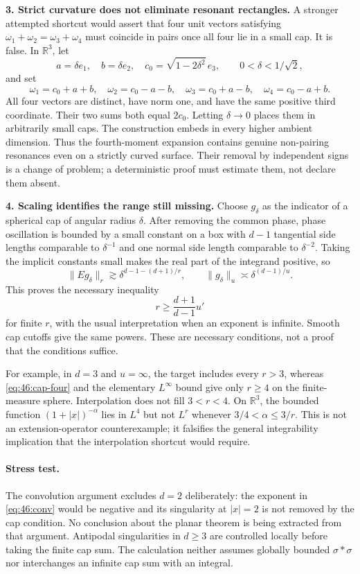 \documentclass[11pt,a4paper]{article}
\newcommand{\R}{\mathbb{R}}
\numberwithin{equation}{section}
\begin{document}
\textbf{3. Strict curvature does not eliminate resonant rectangles.}
A stronger attempted shortcut would assert that four unit vectors satisfying
$\omega_1+\omega_2=\omega_3+\omega_4$ must coincide in pairs once all four
lie in a small cap. It is false. In $\R^3$, let
\[
 a=\delta e_1,\quad b=\delta e_2,\quad
 c_0=\sqrt{1-2\delta^2}\,e_3,\qquad 0<\delta<1/\sqrt2,
\]
and set
\[
 \omega_1=c_0+a+b,\quad \omega_2=c_0-a-b,\quad
 \omega_3=c_0+a-b,\quad \omega_4=c_0-a+b.
\]
All four vectors are distinct, have norm one, and have the same positive
third coordinate. Their two sums both equal $2c_0$. Letting $\delta\to0$
places them in arbitrarily small caps. The construction embeds in every
higher ambient dimension. Thus the fourth-moment expansion contains genuine
non-pairing resonances even on a strictly curved surface. Their removal by
independent signs is a change of problem; a deterministic proof must estimate
them, not declare them absent.

\textbf{4. Scaling identifies the range still missing.}
Choose $g_\delta$ as the indicator of a spherical cap of angular radius
$\delta$. After removing the common phase, phase oscillation is bounded by
a small constant on a box with $d-1$ tangential side lengths comparable to
$\delta^{-1}$ and one normal side length comparable to $\delta^{-2}$.
Taking the implicit constants small makes the real part of the integrand
positive, so
\[
 \|Eg_\delta\|_r\gtrsim
 \delta^{d-1-(d+1)/r},\qquad
 \|g_\delta\|_u\asymp\delta^{(d-1)/u}.
\]
This proves the necessary inequality
\begin{equation}\label{eq:46:knapp}
 r\ge\frac{d+1}{d-1}u'
\end{equation}
for finite $r$, with the usual interpretation when an exponent is infinite.
Smooth cap cutoffs give the same powers. These are necessary conditions,
not a proof that the conditions suffice.

For example, in $d=3$ and $u=\infty$, the target includes every $r>3$,
whereas \eqref{eq:46:cap-four} and the elementary $L^\infty$ bound give only
$r\ge4$ on the finite-measure sphere. Interpolation does not fill $3<r<4$.
On $\R^3$, the bounded function $(1+|x|)^{-\alpha}$ lies in $L^4$ but not
$L^r$ whenever $3/4<\alpha\le3/r$. This is not an extension-operator
counterexample; it falsifies the general integrability implication that the
interpolation shortcut would require.

\paragraph{Stress test.}
The convolution argument excludes $d=2$ deliberately: the exponent in
\eqref{eq:46:conv} would be negative and its singularity at $|x|=2$ is not
removed by the cap condition. No conclusion about the planar theorem is
being extracted from that argument. Antipodal singularities in $d\ge3$
are controlled locally before taking the finite cap sum. The calculation
neither assumes globally bounded $\sigma*\sigma$ nor interchanges an
infinite cap sum with an integral.
\end{document}
